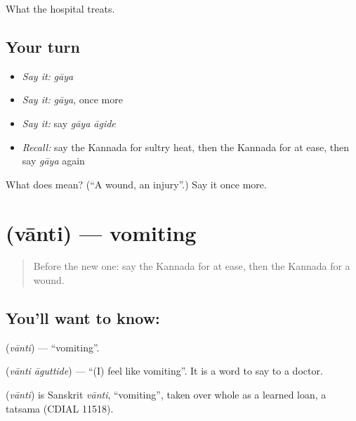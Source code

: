 \begin{grammarlens}[title={What you've built}]
What the hospital treats.
\end{grammarlens}

\subsection*{Your turn}
\begin{itemize}
\raggedright
  \item \emph{Say it:} \emph{gāya}
  \item \emph{Say it:} \emph{gāya}, once more
  \item \emph{Say it:} say \emph{gāya āgide}
  \item \emph{Recall:} say the Kannada for sultry heat, then the Kannada for at ease, then say \emph{gāya} again
\end{itemize}

\begin{tcolorbox}[breakable,colback=teal!4,colframe=teal!35!black,title={Before you move on}]
What does  mean? (\textquotedblleft{}A wound, an injury\textquotedblright{}.) Say it once more.
\end{tcolorbox}
\section[\texorpdfstring{\kn{ವಾಂತಿ} (vānti)}{ವಾಂತಿ (vānti)}]{ (vānti) — vomiting}

\label{lesson:KA-C93-vomiting}



\begin{quote}
Before the new one: say the Kannada for at ease, then the Kannada for a wound.
\end{quote}

\subsection*{You'll want to know: }
\textbf{} (\emph{vānti}) — \textquotedblleft{}vomiting\textquotedblright{}.

\textbf{ } (\emph{vānti āguttide}) — \textquotedblleft{}(I) feel like vomiting\textquotedblright{}. It is a word to say to a doctor.

\begin{cousinweb}
\textbf{} (\emph{vānti}) is Sanskrit \emph{vānti}, \textquotedblleft{}vomiting\textquotedblright{}, taken over whole as a learned loan, a tatsama (CDIAL 11518).
\end{cousinweb}

